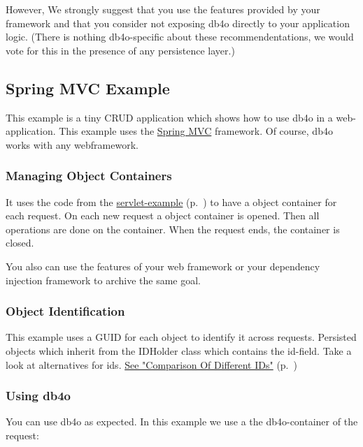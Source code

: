 However, We strongly suggest that you use the features provided by your framework and that you consider not exposing db4o directly to your application logic. (There is nothing db4o-specific about these recommendentations, we would vote for this in the presence of any persistence layer.)

\subsection{Spring MVC Example}
\label{ref:platform-specific-issues-web-spring-mvc-example}

This example is a tiny CRUD application which shows how to use db4o in a web-application. This example uses the \href{https://spring.io/projects/spring-framework}{Spring MVC} framework. Of course, db4o works with any webframework.

\subsubsection*{Managing Object Containers}

It uses the code from the \hyperref[ref:platform-specific-issues-web-servlets]{servlet-example} (p.~\pageref{ref:platform-specific-issues-web-servlets}) to have a object container for each request. On each new request a object container is opened. Then all operations are done on the container. When the request ends, the container is closed.

You also can use the features of your web framework or your dependency injection framework to archive the same goal.

\subsubsection*{Object Identification}

This example uses a GUID for each object to identify it across requests. Persisted objects which inherit from the IDHolder class which contains the id-field. Take a look at alternatives for ids. \hyperref[ref:platform-specific-issues-disconnected-objects-comparison-of-ids]{See "Comparison Of Different IDs"} (p.~\pageref{ref:platform-specific-issues-disconnected-objects-comparison-of-ids})

\subsubsection*{Using db4o}

You can use db4o as expected. In this example we use a the db4o-container of the request:


